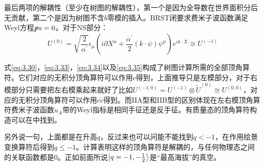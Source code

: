 最后两项的解耦性（至少在树图的解耦性），第一个是因为全导数在世界面积分后无贡献，第二个是因为树图不含$b$零模的插入。BRST闭要求费米子波函数满足Weyl方程$\slashed{p}u=0$。对于NS部分：
\begin{equation}
	\label{eq:3.35}
	U^{(0)}=\sqrt{\frac{2}{\alpha^{\prime}}}\epsilon_\mu\left(i\partial X^\mu+\frac{\alpha^{\prime}}{2}(k\cdot\psi)\psi^\mu\right)e^{ik\cdot X}\cong U^{(-1)}
\end{equation}

式\ref{eq:3.30}，\ref{eq:3.33}，\ref{eq:3.34}以及\ref{eq:3.35}构成了树图计算所需的全部顶角算符。它们对应的无积分顶角算符可以作用$c$得到，上面推导只是左模部分，对于右模部分只需要把左右模乘起来就好了比如$U^{(-1,0)}=U^{(-1)}\otimes \tilde U^{(0)}\cong U^{(0,0)}$，对应的无积分顶角算符可以作用$c\tilde{c}$得到。而IIA型和IIB型的区别体现在左右模顶角算符费米子波函数$u_A$带的Weyl指标是相同手征还是反手征。有质量态的顶角算符构造可以在\cite{Schlotterer:2012zz}中找到。

另外说一句，上面都是在升高$q$，反过来也可以问能不能找到$q<-1$，在作用绘景变换算符后得到$q\leq -1$。计算表明这样的顶角算符是解耦的，与任何物理态之间的关联函数都是0。正如前面所说$\ket{q=-1,-\frac12}$是“最高海拔”的真空。

